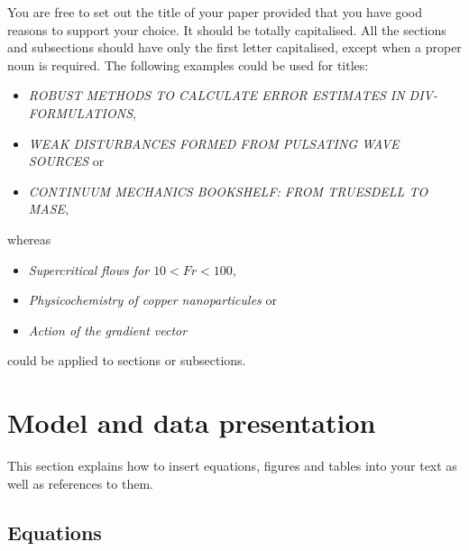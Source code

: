 \documentclass[date]{ppgem}
\begin{document}
\begin{multicols}{2}
You are free to set out the title of your paper provided that you have good reasons to support your choice. It should be totally capitalised. All the sections and subsections should have only the first letter capitalised, except when a proper noun is required. The following examples could be used for titles:
\begin{itemize}
\item  \emph{ROBUST METHODS TO CALCULATE ERROR ESTIMATES IN DIV- FORMULATIONS}, \\
\item  \emph{WEAK DISTURBANCES FORMED FROM PULSATING WAVE SOURCES} or \\
\item  \emph{CONTINUUM MECHANICS BOOKSHELF: FROM TRUESDELL TO MASE}, 
\end{itemize}
whereas
\begin{itemize}
\item  \emph{Supercritical flows for $ 10 < Fr < 100 $}, \\
\item  \emph{Physicochemistry of copper nanoparticules} or  \\
\item  \emph{Action of the gradient vector} 
\end{itemize}
could be applied to sections or subsections. 

\section{Model and data presentation}

This section explains how to insert equations, figures and tables into your text as well as references to them.

\subsection{Equations \label{subsec:eqs}}


\end{multicols}
\end{document}
